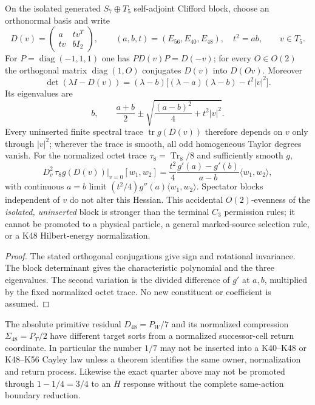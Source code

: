 \documentclass[12pt,a4paper]{article}
\begin{document}
\begin{proposition}
\label{p3c:prop:v1101-terminal-edge-all-orders}
On the isolated generated $S_7\oplus T_5$ self-adjoint Clifford block,
choose an orthonormal basis and write
\[
 D(v)=\begin{pmatrix}a&t v^T\\ t v&bI_2\end{pmatrix},\qquad
 (a,b,t)=(E_{56},E_{40},E_{48}),\quad t^2=ab,
 \qquad v\in T_5.
\]
For $P=\operatorname{diag}(-1,1,1)$ one has
$P D(v)P=D(-v)$; for every $O\in O(2)$ the orthogonal matrix
$\operatorname{diag}(1,O)$ conjugates $D(v)$ into $D(Ov)$. Moreover
\[
 \boxed{\det(\lambda I-D(v))=(\lambda-b)
 \bigl[(\lambda-a)(\lambda-b)-t^2|v|^2\bigr].}
\]
Its eigenvalues are
\[
 \boxed{b,\qquad \frac{a+b}{2}\pm
 \sqrt{\frac{(a-b)^2}{4}+t^2|v|^2}.}
\]
Every uninserted finite spectral trace $\operatorname{tr}g(D(v))$
therefore depends on $v$ only through $|v|^2$; wherever the trace is
smooth, all odd homogeneous Taylor degrees vanish. For the normalized
octet trace $\tau_8=\operatorname{Tr}_8/8$ and sufficiently smooth $g$,
\[
 \boxed{D_v^2\,\tau_8g(D(v))\big|_{v=0}[w_1,w_2]
 =\frac{t^2}{4}\frac{g'(a)-g'(b)}{a-b}
 \langle w_1,w_2\rangle,}
\]
with continuous $a=b$ limit $(t^2/4)g''(a)\langle w_1,w_2\rangle$.
Spectator blocks independent of $v$ do not alter this Hessian.
This accidental $O(2)$-evenness of the \emph{isolated, uninserted}
block is stronger than the terminal $C_3$ permission rules; it cannot
be promoted to a physical particle, a general marked-source selection
rule, or a K48 Hilbert-energy normalization.
\end{proposition}
\begin{proof}
The stated orthogonal conjugations give sign and rotational invariance.
The block determinant gives the characteristic polynomial and the
three eigenvalues. The second variation is the divided difference of
$g'$ at $a,b$, multiplied by the fixed normalized octet trace. No
new constituent or coefficient is assumed.
\end{proof}


\begin{remark}
\label{p3c:rem:v192-k48-residual-firewall}
The absolute primitive residual $D_{48}=P_W/7$ and its normalized compression
$\Sigma_{48}=P_T/2$ have different target sorts from a normalized
successor-cell return coordinate.  In particular the number $1/7$ may not be
inserted into a K40--K48 or K48--K56 Cayley law unless a theorem identifies the
same owner, normalization and return process.  Likewise the exact quarter above
may not be promoted through $1-1/4=3/4$ to an $H$ response without the complete
same-action boundary reduction.
\end{remark}
\end{document}
